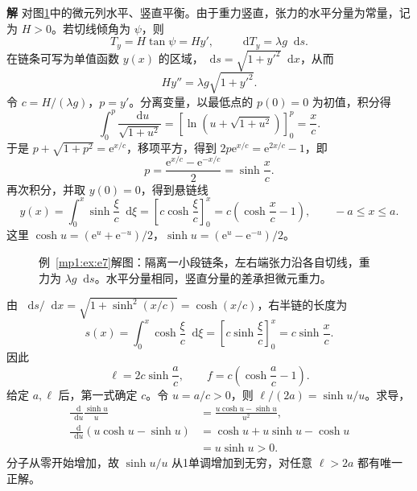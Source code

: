 \documentclass[11pt,openany,fontset=fandol]{ctexbook}
\theoremstyle{definition}\newtheorem{example}{例}[chapter]\newtheorem{exercise}{习题}[chapter]
\newcommand{\SolutionStart}{\par\medskip\ifdim\pagetotal>0pt\ifdim\dimexpr\pagegoal-\pagetotal\relax<3\baselineskip\newpage\fi\fi\noindent\textbf{解}\quad\ignorespaces}
\newenvironment{solution}{\SolutionStart}{\par\medskip}
\newcommand{\dd}{\mathop{}\!\mathrm d}\newcommand{\ee}{\mathrm e}\newcommand{\vct}[1]{\bm{#1}}
\begin{document}
\begin{solution}
对图\ref{mp1:fig:e7-s}中的微元列水平、竖直平衡。由于重力竖直，张力的水平分量为常量，记为 $H>0$。若切线倾角为 $\psi$，则
\[
T_y=H\tan\psi=Hy',\qquad \dd T_y=\lambda g\dd s.
\]
在链条可写为单值函数 $y(x)$ 的区域，$\dd s=\sqrt{1+y'^2}\dd x$，从而
\begin{equation}\label{mp1:eq:catenary-ode}
Hy''=\lambda g\sqrt{1+y'^2}.
\end{equation}
令 $c=H/(\lambda g)$，$p=y'$。分离变量，以最低点的 $p(0)=0$ 为初值，积分得
\[
\int_0^p\frac{\dd u}{\sqrt{1+u^2}}
=\left[\ln\left(u+\sqrt{1+u^2}\right)\right]_0^p
=\frac xc.
\]
于是 $p+\sqrt{1+p^2}=\ee^{x/c}$，移项平方，得到 $2p\ee^{x/c}=\ee^{2x/c}-1$，即
\[
p=\frac{\ee^{x/c}-\ee^{-x/c}}2=\sinh\frac xc.
\]
再次积分，并取 $y(0)=0$，得到悬链线
\[
y(x)=\int_0^x\sinh\frac\xi c\dd\xi
=\left[c\cosh\frac\xi c\right]_0^x
=c\left(\cosh\frac xc-1\right),\qquad -a\le x\le a.
\]
这里 $\cosh u=(\ee^u+\ee^{-u})/2$，$\sinh u=(\ee^u-\ee^{-u})/2$。

\begin{figure}[H]\centering

\caption{例~\ref{mp1:ex:e7}解图：隔离一小段链条，左右端张力沿各自切线，重力为 $\lambda g\dd s$。水平分量相同，竖直分量的差承担微元重力。}\label{mp1:fig:e7-s}
\end{figure}

由 $\dd s/\dd x=\sqrt{1+\sinh^2(x/c)}=\cosh(x/c)$，右半链的长度为
\[
s(x)=\int_0^x\cosh\frac\xi c\dd\xi
=\left[c\sinh\frac\xi c\right]_0^x=c\sinh\frac xc.
\]
因此
\[
\ell=2c\sinh\frac ac,\qquad
f=c\left(\cosh\frac ac-1\right).
\]
给定 $a,\ell$ 后，第一式确定 $c$。令 $u=a/c>0$，则 $\ell/(2a)=\sinh u/u$。求导，
\begin{align*}
\frac{\dd}{\dd u}\frac{\sinh u}{u}
&=\frac{u\cosh u-\sinh u}{u^2},\\
\frac{\dd}{\dd u}(u\cosh u-\sinh u)
&=\cosh u+u\sinh u-\cosh u\\
&=u\sinh u>0.
\end{align*}
分子从零开始增加，故 $\sinh u/u$ 从1单调增加到无穷，对任意 $\ell>2a$ 都有唯一正解。


\end{solution}
\end{document}
